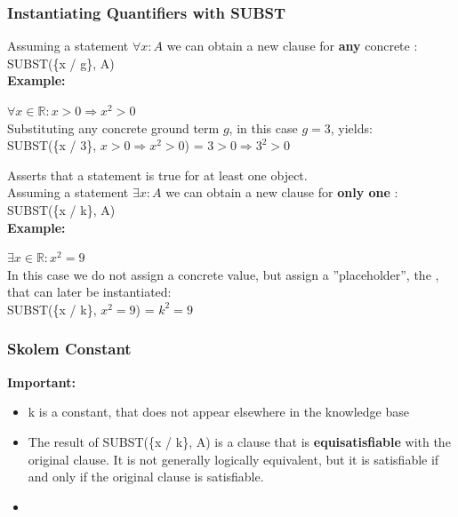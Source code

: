 \documentclass[
../EiKI_Summary.tex,
]
{subfiles}
\begin{document}
\subsubsection{Instantiating Quantifiers with SUBST}
\begin{minipage}
    [t]{0.5\textwidth}
    \begin{defbox}
        Assuming a statement $\forall x: A$ we can obtain a new clause for \textbf{any} concrete :\\
        SUBST(\{x / g\}, A)\\

        \textbf{Example:}\\
        \begin{center}
            $\forall x \in \mathbb{R}: x > 0 \Rightarrow x^2 > 0$\\
            Substituting any concrete ground term $g$, in this case $g = 3$, yields:\\
            SUBST(\{x / 3\}, $x > 0 \Rightarrow x^2 > 0$) = $3 > 0 \Rightarrow 3^2 > 0$\\
        \end{center}
    \end{defbox}
\end{minipage}
\begin{minipage}
    [t]{0.5\textwidth}
    \begin{defbox}
        Asserts that a statement is true for at least one object.\\
        Assuming a statement $\exists x: A$ we can obtain a new clause for \textbf{only one} :\\
        SUBST(\{x / k\}, A)\\

        \textbf{Example:}\\
        \begin{center}
            $\exists x \in \mathbb{R}: x^2 = 9$\\
            In this case we do not assign a concrete value, but assign a ''placeholder'', the , that can later be instantiated:\\
            SUBST(\{x / k\}, $x^2 = 9$) = $k^2 = 9$
        \end{center}
    \end{defbox}
\end{minipage}

\subsubsection*{Skolem Constant}
\textbf{Important:}
\begin{itemize}
    \item k is a constant, that does not appear elsewhere in the knowledge base
    \item The result of SUBST(\{x / k\}, A) is a clause that is \textbf{equisatisfiable} with the original clause. It is not generally logically equivalent, but it is satisfiable if and only if the original clause is satisfiable.
    \item 
\end{itemize}
\end{document}
